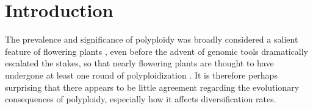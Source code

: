 \section{Introduction}


%
%

The prevalence and significance of polyploidy was broadly considered a salient feature of flowering plants \citep{}, even before the advent of genomic tools dramatically escalated the stakes, so that nearly flowering plants are thought to have undergone at least one round of polyploidization \citep{}.
It is therefore perhaps surprising that there appears to be little agreement regarding the evolutionary consequences of polyploidy, especially how it affects diversification rates. %

